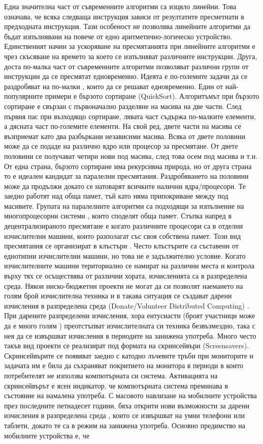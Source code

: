Една значителна част от съвременните алгоритми са изцяло линейни. Това означава, че всяка следваща инструкция зависи от резултатите пресметнати в предходната инструкция. Тази особеност не позволява линейните алгоритми да бъдат изпълнявани на повече от едно аритметично-логическо устройство. Единственият начин за ускоряване на пресмятанията при линейните алгоритми е чрез скъсяване на времето за което се изпълняват различните инструкции. Друга, доста по-малка част от съвременните алгоритми позволяват различни групи от инструкции да се пресмятат едновременно. Идеята е по-големите задачи да се раздробяват на по-малки \cite{Mendivil-01}, които да се решават едновременно. Един от най-популярните примери е бързото сортиране (QuickSort). Алгоритъмът при бързото сортиране е свързан с първоначално разделяне на масива на две части. След първия пас при възходящо сортиране, лявата част съдържа по-малките елементи, а дясната част по-големите елементи. На свой ред, двете части на масива се възприемат като два разбъркани независими масива. Всяка от двете половини може да се подаде на различно ядро или процесор за пресмятане. От двете половини се получават четири нови под масива, след това осем под масива и т.н. От една страна, бързото сортиране има рекурсивна природа, но от друга страна то е идеален кандидат за паралелни пресмятания. Раздробяването на половини може да продължи докато се натоварят всичките налични ядра/процесори. Те заедно работят над обща памет, тъй като няма припокриване между под масивите. Групата на паралелните алгоритми са подходящи за изпълнение на многопроцесорни системи \cite{Topping-01}, които споделят обща памет. Стъпка напред в децентрализираното пресмятане е когато различните процесори са в отделни изчислителни машини, които разполагат със своя собствена памет. Този вид пресмятания се организират в клъстъри \cite{Desell-02}. Често клъстърите са съставени от еднотипни изчислителни машини, но това не е задължително условие. Когато изчислителните машини териториално се намират на различни места и контрола върху тях се осъществява от различни хората, изчисленията са в разпределена среда. Някои ниско-бюджетни проекти не могат да си позволят наемането на голям брой изчислителна техника \cite{Merelo-Guervos-01} и в такава ситуация се създават дарени изчисления в разпределена среда (Donate/Volunteer Distributed Computing) \cite{Varacha-01}. При дарените разпределени изчисления, хора ентусиасти (броят участници може да е много голям \cite{Castillo-01}) преотстъпват изчислителната си техника безвъзмездно, така с нея да се извършват изчисления в периодите на занижена употреба. Много често такъв вид проекти се реализират под формата на скринсейвъри (Screensavers). Скринсейвърите се появяват заедно с катодно лъчевите тръби при мониторите и задачата им е била да съхраняват покритието на монитора в периоди в които потребителят не използва компютърната си система. Активацията на скринсейвърът е ясен индикатор, че компютърната система преминава в състояние на намалена употреба. С масовото навлизане на мобилните устройства през последните петнадесет години, бяха открити нови възможности за дарени изчисления в разпределена среда \cite{Gong-01}, които се извършват на умни телефони или таблети, докато те са в режим на занижена употреба. Основно предимство на мобилните устройства е, че 